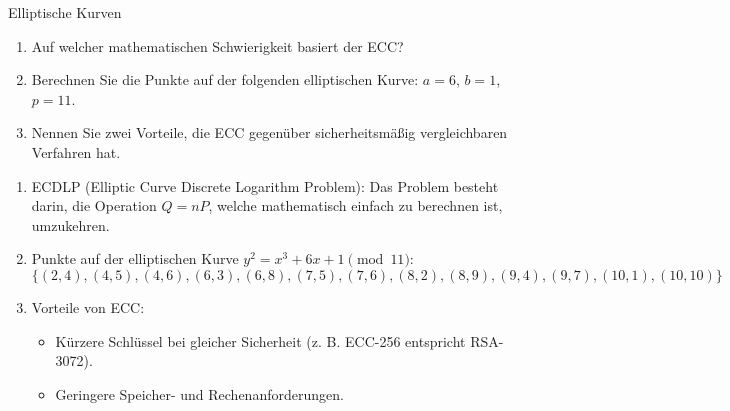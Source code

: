 \documentclass{article}
\begin{document}
\begin{exercise}{Elliptische Kurven}
  \begin{enumerate}
    \item Auf welcher mathematischen Schwierigkeit basiert der ECC?
    \item Berechnen Sie die Punkte auf der folgenden elliptischen Kurve: $a = 6$, $b = 1$, $p = 11$.
    \item Nennen Sie zwei Vorteile, die ECC gegenüber sicherheitsmäßig vergleichbaren Verfahren hat.
  \end{enumerate}

  \begin{solution}
    \begin{enumerate}
        \item ECDLP (Elliptic Curve Discrete Logarithm Problem): Das Problem besteht darin, die Operation $Q=nP$, welche mathematisch einfach zu berechnen ist, umzukehren.
        \item Punkte auf der elliptischen Kurve $y^2 = x^3 + 6x + 1 \pmod{11}$:
          \[ \{(2,4), (4,5), (4,6), (6,3), (6,8), (7,5), (7,6), (8,2), (8,9), (9,4), (9,7), (10,1), (10,10)\} \]
        \item Vorteile von ECC:
          \begin{itemize}
              \item Kürzere Schlüssel bei gleicher Sicherheit (z. B. ECC-256 entspricht RSA-3072).
              \item Geringere Speicher- und Rechenanforderungen.
          \end{itemize}
    \end{enumerate}
  \end{solution}
\end{exercise}
\end{document}
